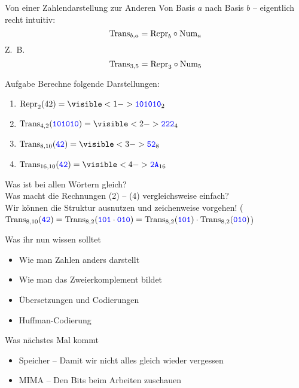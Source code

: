 \begin{frame}{Von einer Zahlendarstellung zur Anderen}
	\vspace{-.2\baselineskip}
	Von Basis $a$ nach Basis $b$ -- eigentlich recht intuitiv:
	$$\text{Trans}_{b,a} = \text{Repr}_b \circ {\text{Num}}_a$$
	Z.~B.
	$$\text{Trans}_{3,5} = \text{Repr}_3 \circ {\text{Num}}_5$$
	
	\begin{block}{Aufgabe}
		Berechne folgende Darstellungen:\\
		\begin{enumerate}[(1)]
			\item $\fRepr_2(42) = \visible<1->{ \word{101010}_2}$ 
			\item $\fTrans_{4,2}(\word{101010}) = \visible<2->{ \word{222}_4}$ 
			\item $\fTrans_{8,10}(\word{42}) = \visible<3->{ \word{52}_8}$ 
			\item $\fTrans_{16,10}(\word{42}) = \visible<4->{ \word{2A}_{16}}$
		\end{enumerate}
	\end{block}

	Was ist bei allen Wörtern gleich?  \\
	Was macht die Rechnungen (2) -- (4) vergleichsweise einfach? \pause[6] \\
	\impl Wir können die Struktur ausnutzen und zeichenweise vorgehen! ($\text{Trans}_{8,10}(\hbox{\textcolor{blue}{\texttt{42}}}) = \text{Trans}_{8,2}(\hbox{\textcolor{blue}{\texttt{101}}} \cdot \hbox{\textcolor{blue}{\texttt{010}}}) = \text{Trans}_{8,2}(\hbox{\textcolor{blue}{\texttt{101}}}) \cdot \text{Trans}_{8,2}(\hbox{\textcolor{blue}{\texttt{010}}})$)
\end{frame}





\begin{frame}	
	\begin{block}{Was ihr nun wissen solltet}
		\begin{itemize}
			\item Wie man Zahlen anders darstellt
			\item Wie man das Zweierkomplement bildet
			\item Übersetzungen und Codierungen
			\item Huffman-Codierung
		\end{itemize}
	\end{block}
	
	\begin{block}{Was nächstes Mal kommt}
		\begin{itemize}
			\item Speicher -- Damit wir nicht alles gleich wieder vergessen
			\item MIMA -- Den Bits beim Arbeiten zuschauen
		\end{itemize}
	\end{block}
\end{frame}


\slideThanks

